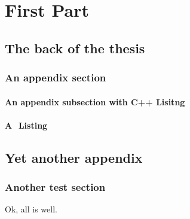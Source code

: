 \documentclass[a4paper,11pt]{MScThesis}
\begin{document}
\cleardoublepage

%
    \part{First Part} %
		
		




%
    


\appendix

    \chapter{The back of the thesis}

    \section{An appendix section}

    \subsection{An appendix subsection with C++ Lisitng}

    \lstset{language=C++}
    

    \subsection{A \matlab $ $ Listing}

    \lstset{language=matlab}
    

    \chapter{Yet another appendix}

    \section{Another test section}

    Ok, all is well.

    \printindex
    \cleardoublepage
\end{document}
